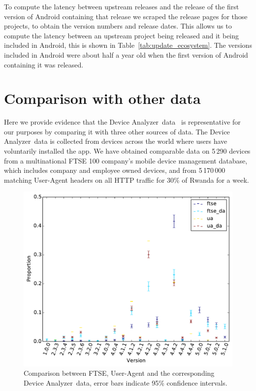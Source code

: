 \documentclass{sig-alternate-2013}
\let\OldTodo\todo
\renewcommand{\todo}{\OldTodo[inline]}
\newcommand{\da}{Device Analyzer}
\begin{document}
To compute the latency between upstream releases and the release of the first version of Android containing that release we scraped the release pages for those projects, to obtain the version numbers and release dates.
This allows us to compute the latency between an upstream project being released and it being included in Android, this is shown in Table~\ref{tab:update_ecosystem}.
The versions included in Android were about half a year old when the first version of Android containing it was released.





\section{Comparison with other data}\label{sec:representative}
Here we provide evidence that the \da\ data~\cite{Wagner2013} is representative for our purposes by comparing it with three other sources of data.
The \da\ data is collected from devices across the world where users have voluntarily installed the app.
We have obtained comparable data on 5\,290 devices from a multinational FTSE 100 company's mobile device management database, which includes company and employee owned devices, and from 5\,170\,000 matching User-Agent headers on all HTTP traffic for 30\% of Rwanda for a week.
\todo{citation for Rwanda dataset}
\begin{figure}
\centering
\includegraphics[width=\columnwidth]{figures/dists}
\caption{Comparison between FTSE, User-Agent and the corresponding \da\ data, error bars indicate 95\% confidence intervals.}
\label{fig:dists}
\end{figure}
\end{document}

